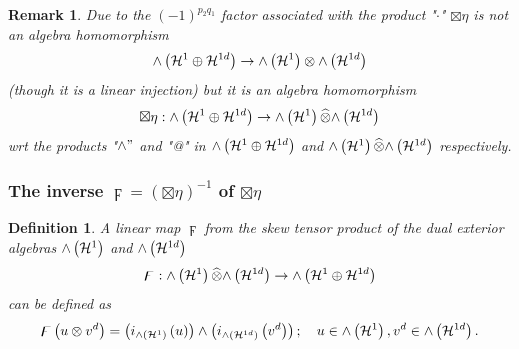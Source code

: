 \documentclass[aps,preprint]{revtex4}%
\newtheorem{definition}[theorem]{Definition}
\newtheorem{remark}[theorem]{Remark}
\begin{document}
\begin{remark}
Due to the $\left(  -1\right)  ^{p_{2}q_{1}}$ factor associated with the
product "$\cdot$" $\boxtimes\eta$ is not an algebra homomorphism
\begin{equation}
{\huge \wedge}\left(  \mathcal{H}^{1}\oplus\mathcal{H}^{1d}\right)
\rightarrow{\huge \wedge}\left(  \mathcal{H}^{1}\right)  \otimes{\huge \wedge
}\left(  \mathcal{H}^{1d}\right)
\end{equation}
(though it is a linear injection) \emph{but it is an algebra homomorphism}
\begin{equation}
\boxtimes\eta:{\huge \wedge}\left(  \mathcal{H}^{1}\oplus\mathcal{H}%
^{1d}\right)  \rightarrow{\huge \wedge}\left(  \mathcal{H}^{1}\right)
\widehat{\otimes}{\huge \wedge}\left(  \mathcal{H}^{1d}\right)
\end{equation}
wrt the products "$\wedge"$ and "@" in ${\huge \wedge}\left(  \mathcal{H}%
^{1}\oplus\mathcal{H}^{1d}\right)  $ and ${\huge \wedge}\left(  \mathcal{H}%
^{1}\right)  \widehat{\otimes}{\huge \wedge}\left(  \mathcal{H}^{1d}\right)  $
respectively. 
\end{remark}

\subsubsection{The inverse $\digamma=\left(  \boxtimes\eta\right)  ^{-1}$ of
$\boxtimes\eta$}

\begin{definition}
A linear map $\digamma$ from the skew tensor product of the dual exterior
algebras ${\huge \wedge}\left(  \mathcal{H}^{1}\right)  $ and ${\huge \wedge
}\left(  \mathcal{H}^{1d}\right)  $
\begin{equation}
\digamma:{\huge \wedge}\left(  \mathcal{H}^{1}\right)  \widehat{\otimes
}{\huge \wedge}\left(  \mathcal{H}^{1d}\right)  \rightarrow{\huge \wedge
}\left(  \mathcal{H}^{1}\oplus\mathcal{H}^{1d}\right)
\end{equation}
can be defined as
\begin{equation}
\digamma\left(  u\otimes v^{d}\right)  =\left(  i_{{\huge \wedge}\left(
\mathcal{H}^{1}\right)  }\left(  u\right)  \right)  \wedge\left(
i_{{\huge \wedge}\left(  \mathcal{H}^{1d}\right)  }\left(  v^{d}\right)
\right)  ;\quad u\in{\huge \wedge}\left(  \mathcal{H}^{1}\right)  ,v^{d}%
\in{\huge \wedge}\left(  \mathcal{H}^{1d}\right)  .
\end{equation}

\end{definition}
\end{document}

